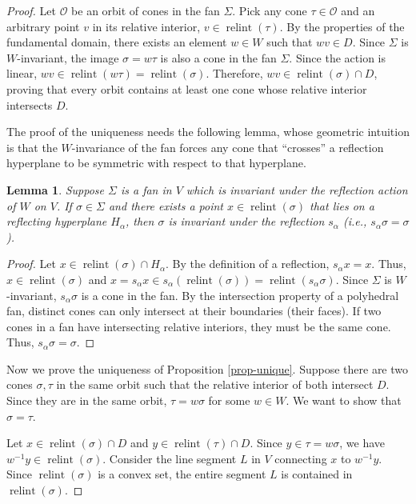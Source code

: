 \documentclass{amsart}
\newtheorem{lemma}[theorem]{Lemma}
\theoremstyle{definition}
\theoremstyle{remark}
\numberwithin{equation}{section}
\begin{document}
\begin{proof}
Let $\mathcal{O}$ be an orbit of cones in the fan $\Sigma$. Pick any cone $\tau \in \mathcal{O}$ and an arbitrary point $v$ in its relative interior, $v \in \operatorname{relint}(\tau)$. By the properties of the fundamental domain, there exists an element $w \in W$ such that $wv \in D$. Since $\Sigma$ is $W$-invariant, the image $\sigma = w\tau$ is also a cone in the fan $\Sigma$. Since the action is linear, $wv \in \operatorname{relint}(w\tau) = \operatorname{relint}(\sigma)$. Therefore, $wv \in \operatorname{relint}(\sigma) \cap D$, proving that every orbit contains at least one cone whose relative interior intersects $D$.

The proof of the uniqueness needs the following lemma, whose geometric intuition is that the $W$-invariance of the fan forces any cone that ``crosses'' a reflection hyperplane to be symmetric with respect to that hyperplane. 

\begin{lemma} \label{lem-intersect}
Suppose $\Sigma$ is a fan in $V$ which is invariant under the reflection action of $W$ on $V$. If $\sigma \in \Sigma$ and there exists a point $x \in \operatorname{relint}(\sigma)$ that lies on a reflecting hyperplane $H_\alpha$, then $\sigma$ is invariant under the reflection $s_\alpha$ (i.e., $s_\alpha \sigma = \sigma$).   
\end{lemma}

\begin{proof}
    Let $x \in \operatorname{relint}(\sigma) \cap H_\alpha$. By the definition of a reflection, $s_\alpha x = x$. Thus, $x \in \operatorname{relint}(\sigma)$ and $x = s_\alpha x \in s_\alpha(\operatorname{relint}(\sigma)) = \operatorname{relint}(s_\alpha \sigma)$. Since $\Sigma$ is $W$-invariant, $s_\alpha \sigma$ is a cone in the fan. By the intersection property of a polyhedral fan, distinct cones can only intersect at their boundaries (their faces). If two cones in a fan have intersecting relative interiors, they must be the same cone. Thus, $s_\alpha \sigma = \sigma$.
\end{proof}

Now we prove the uniqueness of Proposition \ref{prop-unique}. Suppose there are two cones $\sigma, \tau$ in the same orbit such that the relative interior of both intersect $D$. Since they are in the same orbit, $\tau = w\sigma$ for some $w \in W$. We want to show that $\sigma = \tau$.

Let $x \in \operatorname{relint}(\sigma) \cap D$ and $y \in \operatorname{relint}(\tau) \cap D$. Since $y \in \tau = w\sigma$, we have $w^{-1}y \in \operatorname{relint}(\sigma)$. 
Consider the line segment $L$ in $V$ connecting $x$ to $w^{-1}y$. Since $\operatorname{relint}(\sigma)$ is a convex set, the entire segment $L$ is contained in $\operatorname{relint}(\sigma)$. 


\end{proof}
\end{document}
